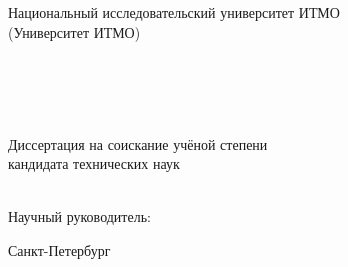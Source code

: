 \thispagestyle{empty}


\vspace{0pt plus2fill} %
\begin{center}
	Национальный исследовательский университет ИТМО \\
	(Университет ИТМО) \\ \ \\
\end{center}

\vspace*{150pt}
\begin{center}
	\textbf {\large
		\PhDStudent
	} \\
	\vspace*{6pt}
	\textbf{{\LARGE 
		\ThesisName
	}} \\
	\vspace*{12pt}
		\MySpeciality \\
	\vspace*{12pt}
	Диссертация на соискание учёной степени \\ кандидата технических наук \\ \ \\ 
	\vspace*{60pt}
	\begin{flushright}
		Научный руководитель:\\ \MySuperviser
	\end{flushright}
\end{center}

\vspace{0pt plus2fill} %

\begin{center}
	Санкт-Петербург~\the\year{}%
\end{center}


